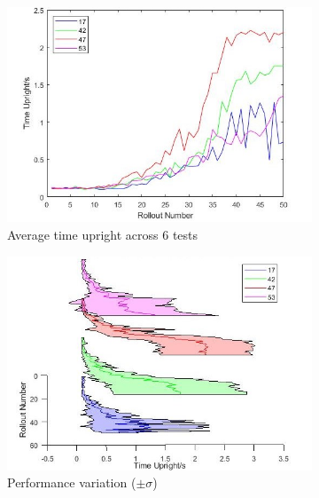 \documentclass[twoside,twocolumn,12pt]{article}
\begin{document}
\clearpage
{}
\begin{figure}[hb!]
  \centering
  \begin{subfigure}[t]{0.325\textwidth}
    \includegraphics[width=\linewidth]{average_angle}
   \caption{Average time upright across 6 tests}
  \label{fig:a}
  \end{subfigure}
  \begin{subfigure}[t]{0.325\textwidth}
    \includegraphics[width=\linewidth]{disp_angle}
    \caption{Performance variation ($\pm \sigma$)}
  \label{fig:sd}
  \end{subfigure}
  \begin{subfigure}[t]{0.325\textwidth}

\end{subfigure}
\end{figure}
\end{document}
